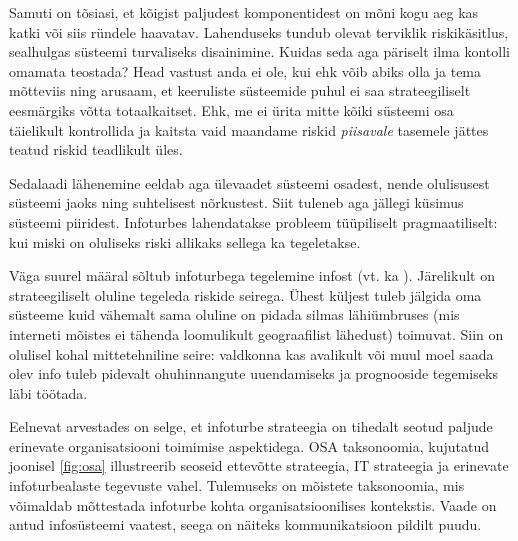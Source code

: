 \documentclass{tufte-book}
\begin{document}
Samuti on tõsiasi, et kõigist paljudest komponentidest on mõni kogu aeg kas katki või siis ründele haavatav. Lahenduseks tundub olevat terviklik riskikäsitlus, sealhulgas süsteemi turvaliseks disainimine. Kuidas seda aga päriselt ilma kontolli omamata teostada? Head vastust anda ei ole, kui ehk võib abiks olla \citeauthor{leveson2011engineering}\cite{leveson2011engineering} ja tema mõtteviis ning arusaam, et keeruliste süsteemide puhul ei saa strateegiliselt eesmärgiks võtta totaalkaitset. Ehk, me ei ürita mitte kõiki süsteemi osa täielikult kontrollida ja kaitsta vaid maandame riskid \emph{piisavale} tasemele jättes teatud riskid teadlikult üles. 

Sedalaadi lähenemine eeldab aga ülevaadet süsteemi osadest, nende olulisusest süsteemi jaoks ning suhtelisest nõrkustest. Siit tuleneb aga jällegi küsimus süsteemi piiridest. Infoturbes lahendatakse probleem tüüpiliselt pragmaatiliselt: kui miski on oluliseks riski allikaks sellega ka tegeletakse.

Väga suurel määral sõltub infoturbega tegelemine infost (vt. ka ). Järelikult on strateegiliselt oluline tegeleda riskide seirega. Ühest küljest tuleb jälgida oma süsteeme kuid vähemalt sama oluline on pidada silmas lähiümbruses (mis interneti mõistes ei tähenda loomulikult geograafilist lähedust) toimuvat. Siin on olulisel kohal mittetehniline seire: valdkonna kas avalikult või muul moel saada olev info tuleb pidevalt ohuhinnangute uuendamiseks ja prognooside tegemiseks läbi töötada. 

Eelnevat arvestades on selge, et infoturbe strateegia on tihedalt seotud paljude erinevate organisatsiooni toimimise aspektidega. OSA taksonoomia, kujutatud joonisel \ref{fig:osa} illustreerib seoseid ettevõtte strateegia, IT strateegia ja erinevate infoturbealaste tegevuste vahel. Tulemuseks on mõistete taksonoomia, mis võimaldab mõttestada infoturbe kohta organisatsioonilises kontekstis. Vaade on antud infosüsteemi vaatest, seega on näiteks kommunikatsioon pildilt puudu. 
\end{document}
